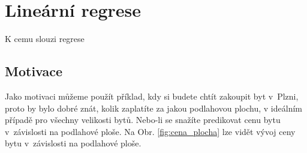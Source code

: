 
\chapter{Lineární regrese}
\label{sec:LinearniRegrese}

\par{K cemu slouzi regrese}










\section{Motivace}
\label{sec:LinearniRegreseMotivace}

\par{Jako motivaci můžeme použít příklad, kdy si budete chtít zakoupit byt v~Plzni, proto by bylo dobré znát, kolik zaplatíte za jakou podlahovou plochu, v ideálním případě pro všechny velikosti bytů. Nebo-li se snažíte predikovat cenu bytu v~závislosti na podlahové ploše. Na Obr. \ref{fig:cena_plocha} lze vidět vývoj ceny bytu v~závislosti na podlahové ploše.}

